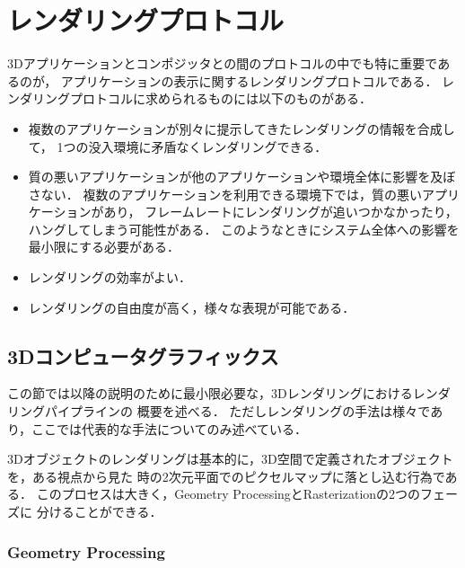 \chapter{レンダリングプロトコル}

3Dアプリケーションとコンポジッタとの間のプロトコルの中でも特に重要であるのが，
アプリケーションの表示に関するレンダリングプロトコルである．
レンダリングプロトコルに求められるものには以下のものがある．

\begin{itemize}
  \item 複数のアプリケーションが別々に提示してきたレンダリングの情報を合成して，
        1つの没入環境に矛盾なくレンダリングできる．
  \item 質の悪いアプリケーションが他のアプリケーションや環境全体に影響を及ぼさない．
        複数のアプリケーションを利用できる環境下では，質の悪いアプリケーションがあり，
        フレームレートにレンダリングが追いつかなかったり，ハングしてしまう可能性がある．
        このようなときにシステム全体への影響を最小限にする必要がある．
  \item レンダリングの効率がよい．
  \item レンダリングの自由度が高く，様々な表現が可能である．
\end{itemize}

\section{3Dコンピュータグラフィックス}
\label{section:3DCG}

この節では以降の説明のために最小限必要な，3Dレンダリングにおけるレンダリングパイプラインの
概要を述べる．
ただしレンダリングの手法は様々であり，ここでは代表的な手法についてのみ述べている．

3Dオブジェクトのレンダリングは基本的に，3D空間で定義されたオブジェクトを，ある視点から見た
時の2次元平面でのピクセルマップに落とし込む行為である．
このプロセスは大きく，Geometry ProcessingとRasterizationの2つのフェーズに
分けることができる．

\subsection*{Geometry Processing}


